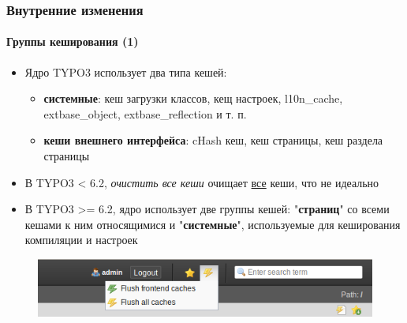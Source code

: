 \begin{frame}[fragile]
	\frametitle{Внутренние изменения}
	\framesubtitle{Группы кеширования (1)}

	\begin{itemize}
		\item Ядро TYPO3 использует два типа кешей:

			\begin{itemize}
				\item \textbf{системные}:
				кеш загрузки классов, кещ настроек, l10n\_cache, extbase\_object, extbase\_reflection и т. п.
				\item \textbf{кеши внешнего интерфейса}:
				cHash кеш, кеш страницы, кеш раздела страницы
			\end{itemize}

		\item В TYPO3 < 6.2, \textit{очистить все кеши} очищает \underline{все} кеши, что не идеально

		\item В TYPO3 >= 6.2, ядро использует две группы кешей:\newline
			"\textbf{страниц}" со всеми кешами к ним относящимися и "\textbf{системные}",
			используемые для кеширования компиляции и настроек

	\end{itemize}

	\begin{figure}
		\includegraphics[width=0.5\linewidth]{Images/InDepthChanges/CacheGroups.png}
	\end{figure}

\end{frame}


